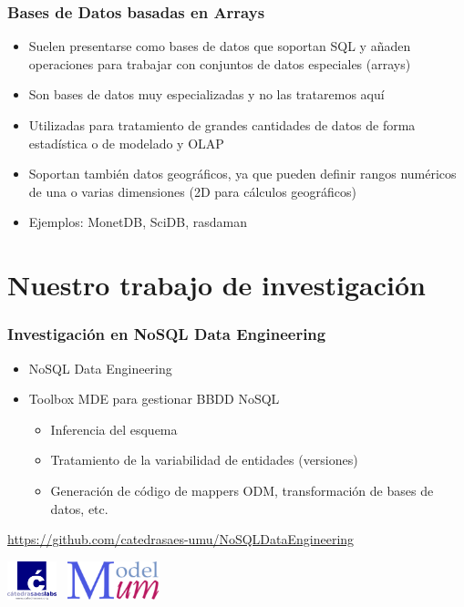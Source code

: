 \documentclass[14pt]{beamer}
\begin{document}
\begin{frame}
\begin{itemize}
\begin{frame}[allowframebreaks]
  \frametitle{Bases de Datos basadas en Arrays}
  \begin{itemize}
\item Suelen presentarse como bases de datos que soportan SQL y añaden
  operaciones para trabajar con conjuntos de datos especiales (arrays)
\item Son bases de datos muy especializadas y no las trataremos aquí
\item Utilizadas para tratamiento de grandes cantidades de datos de forma
  estadística o de modelado y OLAP
\item Soportan también datos geográficos, ya que pueden definir rangos
  numéricos de una o varias dimensiones (2D para cálculos geográficos)
\item Ejemplos: MonetDB, SciDB, rasdaman
  \end{itemize}
\end{frame}


\section{Nuestro trabajo de investigación}

\begin{frame}
  \frametitle{Investigación en NoSQL Data Engineering}

  \begin{itemize}
  \item NoSQL Data Engineering
  \item Toolbox MDE para gestionar BBDD NoSQL
    \begin{itemize}
    \item Inferencia del esquema
    \item Tratamiento de la variabilidad de entidades (versiones)
    \item Generación de código de mappers ODM, transformación de bases de
      datos, etc.
    \end{itemize}
  \end{itemize}

  \url{https://github.com/catedrasaes-umu/NoSQLDataEngineering}

\centering  \includegraphics[height=3em]{img/logo_catedra}%
  ~\includegraphics[height=3em]{img/logo_modelum}


\end{frame}
\end{itemize}
\end{frame}
\end{document}
